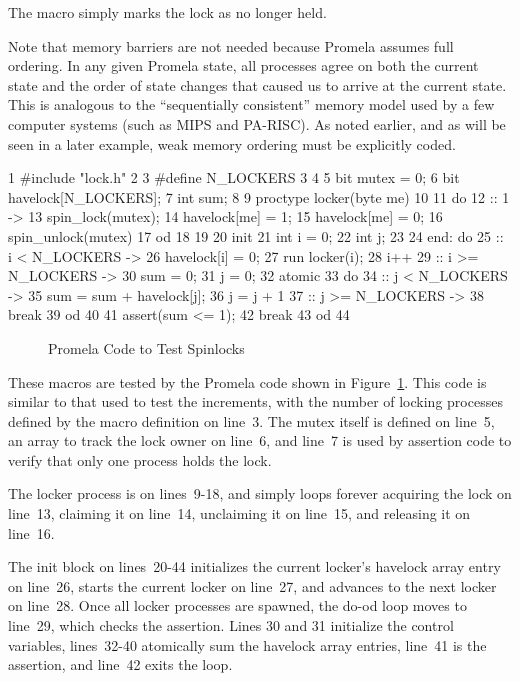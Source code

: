 The  macro simply marks the lock as no
longer held.

Note that memory barriers are not needed because Promela assumes
full ordering.
In any given Promela state, all processes agree on both the current
state and the order of state changes that caused us to arrive at
the current state.
This is analogous to the ``sequentially consistent'' memory model
used by a few computer systems (such as MIPS and PA-RISC).
As noted earlier, and as will be seen in a later example,
weak memory ordering must be explicitly coded.

{ \scriptsize
\begin{verbbox}
  1 #include "lock.h"
  2
  3 #define N_LOCKERS 3
  4
  5 bit mutex = 0;
  6 bit havelock[N_LOCKERS];
  7 int sum;
  8
  9 proctype locker(byte me)
 10 {
 11   do
 12   :: 1 ->
 13     spin_lock(mutex);
 14     havelock[me] = 1;
 15     havelock[me] = 0;
 16     spin_unlock(mutex)
 17   od
 18 }
 19
 20 init {
 21   int i = 0;
 22   int j;
 23
 24 end:  do
 25   :: i < N_LOCKERS ->
 26     havelock[i] = 0;
 27     run locker(i);
 28     i++
 29   :: i >= N_LOCKERS ->
 30     sum = 0;
 31     j = 0;
 32     atomic {
 33       do
 34       :: j < N_LOCKERS ->
 35         sum = sum + havelock[j];
 36         j = j + 1
 37       :: j >= N_LOCKERS ->
 38         break
 39       od
 40     }
 41     assert(sum <= 1);
 42     break
 43   od
 44 }
\end{verbbox}
}
\begin{figure}[tb]
\centering
\theverbbox
\caption{Promela Code to Test Spinlocks}
\label{fig:analysis:Promela Code to Test Spinlocks}
\end{figure}

These macros are tested by the Promela code shown in
Figure~\ref{fig:analysis:Promela Code to Test Spinlocks}.
This code is similar to that used to test the increments,
with the number of locking processes defined by the 
macro definition on line~3.
The mutex itself is defined on line~5, an array to track the lock owner
on line~6, and line~7 is used by assertion
code to verify that only one process holds the lock.

The locker process is on lines~9-18, and simply loops forever
acquiring the lock on line~13, claiming it on line~14,
unclaiming it on line~15, and releasing it on line~16.

The init block on lines~20-44 initializes the current locker's
havelock array entry on line~26, starts the current locker on
line~27, and advances to the next locker on line~28.
Once all locker processes are spawned, the do-od loop
moves to line~29, which checks the assertion.
Lines 30 and 31 initialize the control variables,
lines~32-40 atomically sum the havelock array entries,
line~41 is the assertion, and line~42 exits the loop.

